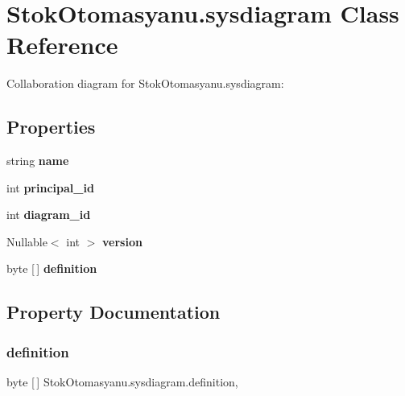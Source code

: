 \section{Stok\+Otomasyanu.\+sysdiagram Class Reference}
\label{class_stok_otomasyanu_1_1sysdiagram}


Collaboration diagram for Stok\+Otomasyanu.\+sysdiagram\+:
\subsection*{Properties}
\begin{DoxyCompactItemize}
\item 
string \textbf{ name}\hspace{0.3cm}{\ttfamily  [get, set]}
\item 
int \textbf{ principal\+\_\+id}\hspace{0.3cm}{\ttfamily  [get, set]}
\item 
int \textbf{ diagram\+\_\+id}\hspace{0.3cm}{\ttfamily  [get, set]}
\item 
Nullable$<$ int $>$ \textbf{ version}\hspace{0.3cm}{\ttfamily  [get, set]}
\item 
byte [$\,$] \textbf{ definition}\hspace{0.3cm}{\ttfamily  [get, set]}
\end{DoxyCompactItemize}


\subsection{Property Documentation}
\mbox{\label{class_stok_otomasyanu_1_1sysdiagram_a6612581b834174a7d3caac8d59845fcf}} 
\subsubsection{definition}
{\footnotesize\ttfamily byte [$\,$] Stok\+Otomasyanu.\+sysdiagram.\+definition\hspace{0.3cm}{\ttfamily [get]}, {\ttfamily [set]}}

\mbox{\label{class_stok_otomasyanu_1_1sysdiagram_a9f5c589c51ba01eca5c9759e4384d59b}} 
